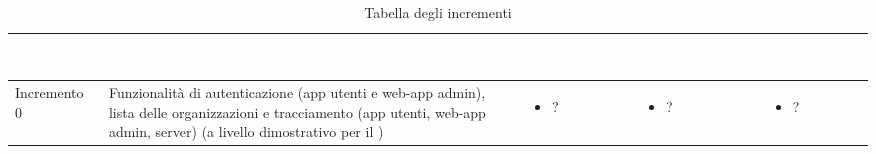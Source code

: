 {
\renewcommand{\arraystretch}{2}
\centering
	
\begin{longtable}{C{2.5cm} C{3.2cm} C{2.8cm} C{2.8cm} C{2.8cm}}
\caption{Tabella degli incrementi}\\
\textcolor{white}{\textbf{Incremento}} &
\textcolor{white}{\textbf{Obiettivo dell'incremento}} & 
\textcolor{white}{\textbf{Requisiti per l'app utenti}} &
\textcolor{white}{\textbf{Requisiti per il web-app admin}} &
\textcolor{white}{\textbf{Requisiti per il server}} \\
\endhead

Incremento 0 & Funzionalità di autenticazione (app utenti e web-app admin), lista delle organizzazioni e tracciamento (app utenti, web-app admin, server) (a livello dimostrativo per il ) & \begin{itemize}
    \item[ ] ?
\end{itemize} & \begin{itemize}
    \item[ ] ?
\end{itemize} & \begin{itemize} 
    \item[ ] ?
\end{itemize}\\


\end{longtable}}
